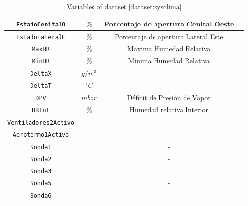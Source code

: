 \begin{table}
\begin{tabular}{|c|c|c|c|}
        \texttt{EstadoCenitalO}     & $\%$           & Porcentaje de apertura Cenital Oeste     \\ \hline
        \texttt{EstadoLateralE}     & $\%$           & Porcentaje de apertura Lateral Este      \\ \hline
        \texttt{MaxHR}              & $\%$           & Maxima Humedad Relativa      \\ \hline
        \texttt{MinHR}              & $\%$           & Mínima Humedad Relativa      \\ \hline
        \texttt{DeltaX}             & $g/m^3$        &                              \\ \hline
        \texttt{DeltaT}             & $^\circ C$     &                              \\ \hline
        \texttt{DPV}                & $mbar$         & Déficit de Presión de Vapor  \\  \hline
        \texttt{HRInt}              & $\%$           & Humedad relativa Interior    \\ \hline
        \texttt{Ventiladores2Activo}&                &         -                    \\ \hline
        \texttt{Aerotermo1Activo}   &                &         -                    \\ \hline
        \texttt{Sonda1}             &                &         -                    \\ \hline
        \texttt{Sonda2}             &                &         -                    \\ \hline
        \texttt{Sonda3}             &                &         -                    \\ \hline
        \texttt{Sonda5}             &                &         -                    \\ \hline
        \texttt{Sonda6}             &                &         -                    \\
        \hline
    \end{tabular}
    \caption{Variables of dataset \ref{dataset:sysclima}}
    \label{table:SysClimaDS}
\end{table}



